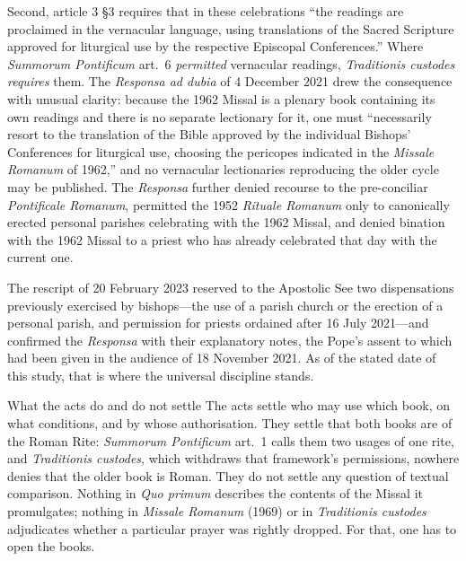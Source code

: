Second, article 3 \S 3 requires that in these celebrations ``the readings are proclaimed in the vernacular language, using translations of the Sacred Scripture approved for liturgical use by the respective Episcopal Conferences.'' Where \emph{Summorum Pontificum} art.~6 \emph{permitted} vernacular readings, \emph{Traditionis custodes} \emph{requires} them. The \emph{Responsa ad dubia} of 4 December 2021 drew the consequence with unusual clarity: because the 1962 Missal is a plenary book containing its own readings and there is no separate lectionary for it, one must ``necessarily resort to the translation of the Bible approved by the individual Bishops' Conferences for liturgical use, choosing the pericopes indicated in the \emph{Missale Romanum} of 1962,'' and no vernacular lectionaries reproducing the older cycle may be published. The \emph{Responsa} further denied recourse to the pre-conciliar \emph{Pontificale Romanum}, permitted the 1952 \emph{Rituale Romanum} only to canonically erected personal parishes celebrating with the 1962 Missal, and denied bination with the 1962 Missal to a priest who has already celebrated that day with the current one.

The rescript of 20 February 2023 reserved to the Apostolic See two dispensations previously exercised by bishops---the use of a parish church or the erection of a personal parish, and permission for priests ordained after 16 July 2021---and confirmed the \emph{Responsa} with their explanatory notes, the Pope's assent to which had been given in the audience of 18 November 2021. As of the stated date of this study, that is where the universal discipline stands.

\begin{studybox}{What the acts do and do not settle}
The acts settle who may use which book, on what conditions, and by whose authorisation. They settle that both books are of the Roman Rite: \emph{Summorum Pontificum} art.~1 calls them two usages of one rite, and \emph{Traditionis custodes}, which withdraws that framework's permissions, nowhere denies that the older book is Roman. They do not settle any question of textual comparison. Nothing in \emph{Quo primum} describes the contents of the Missal it promulgates; nothing in \emph{Missale Romanum} (1969) or in \emph{Traditionis custodes} adjudicates whether a particular prayer was rightly dropped. For that, one has to open the books.
\end{studybox}
